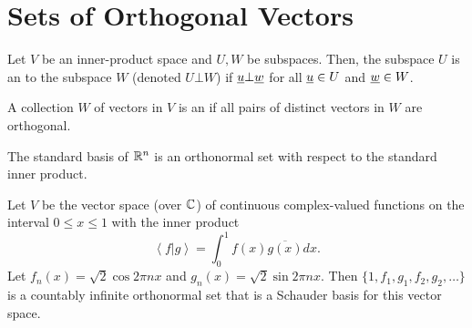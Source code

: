 \section{Sets of Orthogonal Vectors}

\begin{definition}
Let $V$ be an inner-product space and $U,W$ be subspaces.
Then, the subspace $U$ is an  to the subspace $W$ (denoted $U \bot W$) if $\underline{u} \bot \underline{w}$ for all $\underline{u}\in U$ and $\underline{w}\in W$.
\end{definition}

\begin{definition}
A collection $W$ of vectors in $V$ is an  if all pairs of distinct vectors in $W$ are orthogonal.
\end{definition}

\begin{example}
The standard basis of $\mathbb{R}^n$ is an orthonormal set with respect to the standard inner product.
\end{example}

\begin{example}
Let $V$ be the vector space (over $\mathbb{C}$) of continuous complex-valued functions on the interval $0 \leq x \leq 1$ with the inner product
\begin{equation*}
\left\langle f | g \right\rangle = \int_0^1 f(x) \overline{g(x)} dx.
\end{equation*}
Let $f_n(x) = \sqrt{2} \cos 2 \pi n x$ and $g_n (x) = \sqrt{2} \sin 2 \pi n x$.
Then $\{ 1, f_1, g_1, f_2, g_2, \ldots \}$ is a countably infinite orthonormal set that is a Schauder basis for this vector space.
\end{example}

